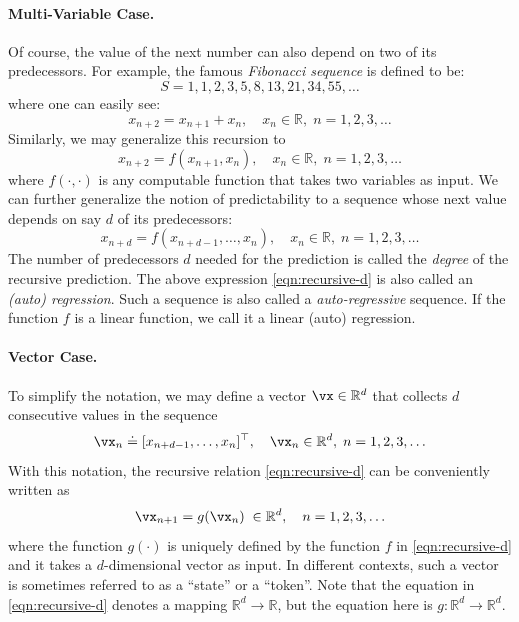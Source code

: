 \documentclass[../../book-main.tex]{subfiles}
\begin{document}
\paragraph{Multi-Variable Case.}
Of course, the value of the next number can also depend on two of its predecessors. For example, the famous {\em Fibonacci sequence} is defined to be:
\begin{equation}
    {S} = 1, 1, 2, 3, 5, 8, 13, 21, 34, 55, \ldots
\end{equation}
where one can easily see:
\begin{equation}
    x_{n+2} = x_{n+1} + x_{n}, \quad  x_n \in \mathbb{R}, \;  n = 1, 2, 3, \ldots
\end{equation}
Similarly, we may generalize this recursion to \begin{equation}
    x_{n+2} = f(x_{n+1}, x_{n}), \quad x_n \in \mathbb{R}, \;  n =  1, 2, 3, \ldots
\end{equation}
where $f(\cdot,\cdot)$ is any computable function that takes two variables as input. We can further generalize the notion of predictability to a sequence whose next value depends on say $d$ of its predecessors:
\begin{equation}
    x_{n+d} = f(x_{n+d-1}, \ldots,  x_{n}), \quad  x_n \in \mathbb{R}, \; n =  1, 2, 3, \ldots
    \label{eqn:recursive-d}
\end{equation}
The number of predecessors $d$ needed for the prediction is called the {\em degree} of the recursive prediction. The above expression \eqref{eqn:recursive-d} is also called an {\em (auto) regression}. Such a sequence is also called a {\em auto-regressive} sequence. If the function $f$ is a linear function, we call it a linear (auto) regression. 

\paragraph{Vector Case.} 
To simplify the notation, we may define a vector $\vx \in \mathbb{R}^d$ that collects $d$ consecutive values in the sequence  \begin{equation}
    \vx_n \doteq [x_{n+d-1}, \ldots,  x_{n}]^\top, \quad \vx_n \in \mathbb{R}^d, \; n = 1, 2, 3, \ldots
\end{equation}
With this notation, the recursive relation \eqref{eqn:recursive-d} can be conveniently written as
\begin{equation}
    \vx_{n+1} = g(\vx_{n}) \; \in \mathbb{R}^d, \quad n =  1, 2, 3, \ldots
    \label{eqn:recursive-v}
\end{equation}
where the function $g(\cdot)$ is uniquely defined by the function $f$ in \eqref{eqn:recursive-d} and it  takes a $d$-dimensional vector as input. In different contexts, such a vector is sometimes referred to as a ``state'' or a ``token''. Note that the equation in \eqref{eqn:recursive-d} denotes a mapping $\mathbb{R}^d \rightarrow \mathbb{R}$, but the equation here is $g: \mathbb{R}^d \rightarrow \mathbb{R}^d$.
\end{document}
